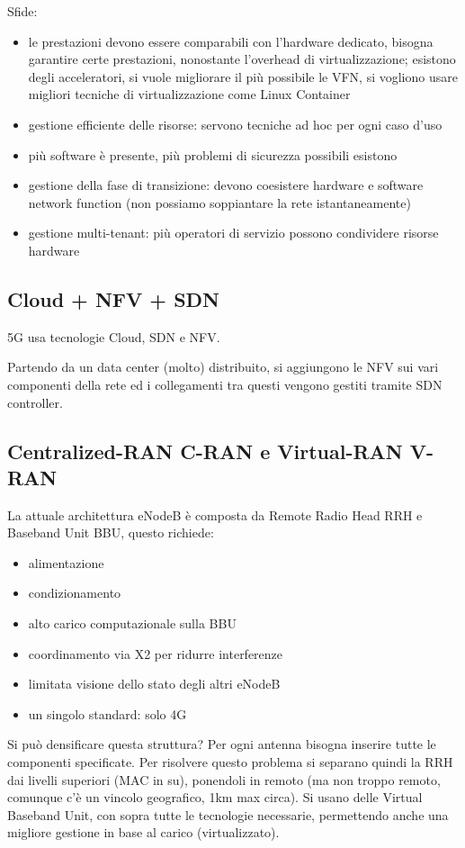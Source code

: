 Sfide: 
\begin{itemize}
	\item le prestazioni devono essere comparabili con l'hardware dedicato, bisogna garantire certe prestazioni, nonostante l'overhead di virtualizzazione; esistono degli acceleratori, si vuole migliorare il più possibile le VFN, si vogliono usare migliori tecniche di virtualizzazione come Linux Container
	\item gestione efficiente delle risorse: servono tecniche ad hoc per ogni caso d'uso
	\item più software è presente, più problemi di sicurezza possibili esistono
	\item gestione della fase di transizione: devono coesistere hardware e software network function (non possiamo soppiantare la rete istantaneamente)
	\item gestione multi-tenant: più operatori di servizio possono condividere risorse hardware
\end{itemize}

\subsection*{Cloud + NFV + SDN}

5G usa tecnologie Cloud, SDN e NFV.

Partendo da un data center (molto) distribuito, si aggiungono le NFV sui vari componenti della rete ed i collegamenti tra questi vengono gestiti tramite SDN controller.

\subsection{Centralized-RAN C-RAN e Virtual-RAN V-RAN}

La attuale architettura eNodeB è composta da Remote Radio Head RRH e Baseband Unit BBU, questo richiede: 
\begin{itemize}
	\item alimentazione
	\item condizionamento
	\item alto carico computazionale sulla BBU
	\item coordinamento via X2 per ridurre interferenze
	\item limitata visione dello stato degli altri eNodeB
	\item un singolo standard: solo 4G
\end{itemize}

Si può densificare questa struttura? Per ogni antenna bisogna inserire tutte le componenti specificate. Per risolvere questo problema si separano quindi la RRH dai livelli superiori (MAC in su), ponendoli in remoto (ma non troppo remoto, comunque c'è un vincolo geografico, 1km max circa). Si usano delle Virtual Baseband Unit, con sopra tutte le tecnologie necessarie, permettendo anche una migliore gestione in base al carico (virtualizzato).

